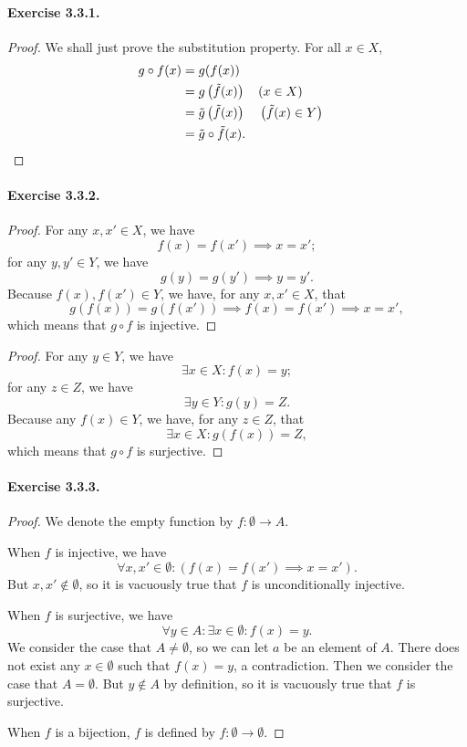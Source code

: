 \paragraph{Exercise 3.3.1.}
\begin{proof}
    We shall just prove the substitution property. For all $x\in X$, 
    \begin{align*}
        g\circ f(x) &= g(f(x)) \\&= g\left(\tilde{f}(x)\right) && (x\in X)
        \\&= \tilde{g}\left(\tilde{f}(x)\right) && \left(\tilde{f}(x) \in Y\right)
        \\&= \tilde{g}\circ \tilde{f}(x). \qedhere
    \end{align*}
\end{proof}

\paragraph{Exercise 3.3.2.}
\begin{proof}
    For any $x,x'\in X$, we have \[ f(x) = f(x') \implies x=x';\] for any $y,y' \in Y$, we have \[ g(y) = g(y') \implies y=y'.\] Because $f(x),f(x')\in Y$, we have, for any $x,x'\in X$, that \[ g(f(x)) = g(f(x')) \implies f(x) = f(x') \implies x=x' ,\] which means that $g\circ f$ is injective.
\end{proof}
\begin{proof}
    For any $y\in Y$, we have \[ \exists x\in X : f(x)=y ;\] for any $z \in Z$, we have \[ \exists y\in Y : g(y)=Z.\] Because any $f(x)\in Y$, we have, for any $z\in Z$, that \[ \exists x\in X : g(f(x)) =Z, \] which means that $g\circ f$ is surjective.
\end{proof}

\paragraph{Exercise 3.3.3.}
\begin{proof}
    We denote the empty function by $f:\emptyset\to A$.

    When $f$ is injective, we have \[ \forall x,x'\in \emptyset: (f(x) = f(x') \implies x=x').\] But $x,x'\notin \emptyset$, so it is vacuously true that $f$ is unconditionally injective. 
    
    When $f$ is surjective, we have \[ \forall y \in A: \exists x\in \emptyset : f(x)=y.\] We consider the case that $A \neq \emptyset$, so we can let $a$ be an element of $A$. There does not exist any $x\in \emptyset$ such that $f(x)=y$, a contradiction. Then we consider the case that $A=\emptyset$. But $y\notin A$ by definition, so it is vacuously true that $f$ is surjective. 
    
    When $f$ is a bijection, $f$ is defined by $f:\emptyset\to\emptyset$.
\end{proof}

